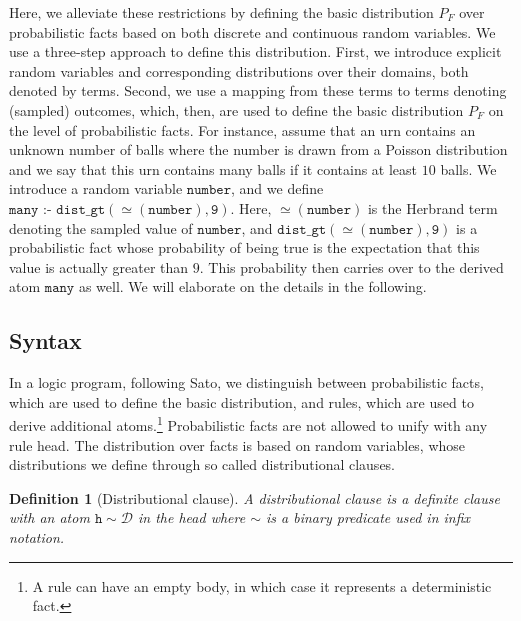 \documentclass{tlp}
\newtheorem{definition}{Definition}
\newcommand{\coloneq}{\mbox{ :- }}
\newcommand{\val}{\simeq\!\!}
\begin{document}
Here, we alleviate these restrictions by defining the basic
distribution $P_F$ over probabilistic facts based on both discrete and
continuous random variables.  We use a three-step approach to define
this distribution. First, we introduce explicit random variables and
corresponding distributions over their domains, both denoted by
terms. Second, we use a mapping from these terms to terms denoting
(sampled) outcomes, which, then, are used to define the basic
distribution $P_F$ on the level of probabilistic facts. For instance,
assume that an urn contains an unknown number of balls where the
number is drawn from a Poisson distribution and we say
that this urn contains many balls if it contains at least $10$
balls. We introduce a random variable $\mathtt{number}$, and we define
$\mathtt{many} \coloneq \mathtt{dist\_gt(\val(number), 9).}$ Here,
$\val(\mathtt{number})$ is the Herbrand term denoting the sampled
value of $\mathtt{number}$, and $\mathtt{dist\_gt(\val(number), 9)}$
is a probabilistic fact whose probability of being true is the
expectation that this value is actually greater than $9$. This
probability then carries over to the derived atom $\mathtt{many}$ as
well.  We will elaborate on the details in the following.

\subsection{Syntax}
\label{sec:syntax}

In a logic program, following Sato, we distinguish between
probabilistic facts, which are used to define the basic distribution,
and rules, which are used to derive additional atoms.\footnote{A rule
  can have an empty body, in which case it represents a deterministic
  fact.} Probabilistic facts are not allowed to unify with any rule
head.  The distribution over facts is based on random variables, whose
distributions we define through so called distributional clauses.

\begin{definition}[Distributional clause]
  \label{def:disclause}
  A \emph{distributional clause} is a definite clause with an atom
  $\mathtt{h} \sim \mathcal{D}$ in the head where $\sim$ is a binary
  predicate used in infix notation.
\end{definition}
\end{document}
